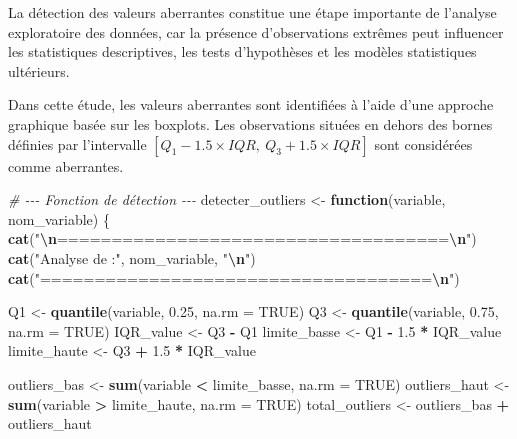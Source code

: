 \documentclass[
]{article}
\newenvironment{Shaded}{\begin{snugshade}}{\end{snugshade}}
\newcommand{\AttributeTok}[1]{\textcolor[rgb]{0.13,0.29,0.53}{#1}}
\newcommand{\CommentTok}[1]{\textcolor[rgb]{0.56,0.35,0.01}{\textit{#1}}}
\newcommand{\ConstantTok}[1]{\textcolor[rgb]{0.56,0.35,0.01}{#1}}
\newcommand{\ControlFlowTok}[1]{\textcolor[rgb]{0.13,0.29,0.53}{\textbf{#1}}}
\newcommand{\FloatTok}[1]{\textcolor[rgb]{0.00,0.00,0.81}{#1}}
\newcommand{\FunctionTok}[1]{\textcolor[rgb]{0.13,0.29,0.53}{\textbf{#1}}}
\newcommand{\NormalTok}[1]{#1}
\newcommand{\OtherTok}[1]{\textcolor[rgb]{0.56,0.35,0.01}{#1}}
\newcommand{\SpecialCharTok}[1]{\textcolor[rgb]{0.81,0.36,0.00}{\textbf{#1}}}
\newcommand{\StringTok}[1]{\textcolor[rgb]{0.31,0.60,0.02}{#1}}
\begin{document}
La détection des valeurs aberrantes constitue une étape importante de
l'analyse exploratoire des données, car la présence d'observations
extrêmes peut influencer les statistiques descriptives, les tests
d'hypothèses et les modèles statistiques ultérieurs.

Dans cette étude, les valeurs aberrantes sont identifiées à l'aide d'une
approche graphique basée sur les boxplots. Les observations situées en
dehors des bornes définies par l'intervalle
\([Q_1 - 1.5 \times IQR,\ Q_3 + 1.5 \times IQR]\) sont considérées comme
aberrantes.

\begin{Shaded}
\begin{Highlighting}[]
\CommentTok{\# {-}{-}{-} Fonction de détection {-}{-}{-}}
\NormalTok{detecter\_outliers }\OtherTok{\textless{}{-}} \ControlFlowTok{function}\NormalTok{(variable, nom\_variable) \{}
  \FunctionTok{cat}\NormalTok{(}\StringTok{"}\SpecialCharTok{\textbackslash{}n}\StringTok{====================================}\SpecialCharTok{\textbackslash{}n}\StringTok{"}\NormalTok{)}
  \FunctionTok{cat}\NormalTok{(}\StringTok{"Analyse de :"}\NormalTok{, nom\_variable, }\StringTok{"}\SpecialCharTok{\textbackslash{}n}\StringTok{"}\NormalTok{)}
  \FunctionTok{cat}\NormalTok{(}\StringTok{"====================================}\SpecialCharTok{\textbackslash{}n}\StringTok{"}\NormalTok{)}

\NormalTok{  Q1 }\OtherTok{\textless{}{-}} \FunctionTok{quantile}\NormalTok{(variable, }\FloatTok{0.25}\NormalTok{, }\AttributeTok{na.rm =} \ConstantTok{TRUE}\NormalTok{)}
\NormalTok{  Q3 }\OtherTok{\textless{}{-}} \FunctionTok{quantile}\NormalTok{(variable, }\FloatTok{0.75}\NormalTok{, }\AttributeTok{na.rm =} \ConstantTok{TRUE}\NormalTok{)}
\NormalTok{  IQR\_value }\OtherTok{\textless{}{-}}\NormalTok{ Q3 }\SpecialCharTok{{-}}\NormalTok{ Q1}
\NormalTok{  limite\_basse }\OtherTok{\textless{}{-}}\NormalTok{ Q1 }\SpecialCharTok{{-}} \FloatTok{1.5} \SpecialCharTok{*}\NormalTok{ IQR\_value}
\NormalTok{  limite\_haute }\OtherTok{\textless{}{-}}\NormalTok{ Q3 }\SpecialCharTok{+} \FloatTok{1.5} \SpecialCharTok{*}\NormalTok{ IQR\_value}

\NormalTok{  outliers\_bas  }\OtherTok{\textless{}{-}} \FunctionTok{sum}\NormalTok{(variable }\SpecialCharTok{\textless{}}\NormalTok{ limite\_basse, }\AttributeTok{na.rm =} \ConstantTok{TRUE}\NormalTok{)}
\NormalTok{  outliers\_haut }\OtherTok{\textless{}{-}} \FunctionTok{sum}\NormalTok{(variable }\SpecialCharTok{\textgreater{}}\NormalTok{ limite\_haute, }\AttributeTok{na.rm =} \ConstantTok{TRUE}\NormalTok{)}
\NormalTok{  total\_outliers }\OtherTok{\textless{}{-}}\NormalTok{ outliers\_bas }\SpecialCharTok{+}\NormalTok{ outliers\_haut}


\end{Highlighting}
\end{Shaded}
\end{document}
